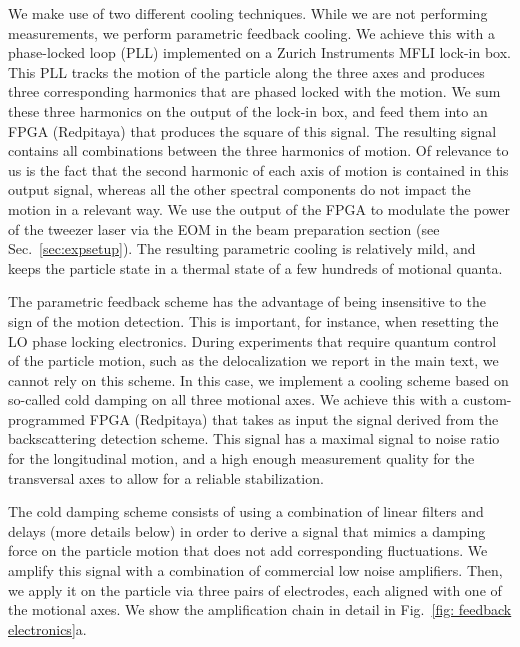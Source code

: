 \documentclass[aps, 
reprint, 
notitlepage,  superscriptaddress, 
onecolumn]{revtex4-1}
\newcommand{\<}{\langle}
\renewcommand{\>}{\rangle}
\begin{document}
We make use of two different cooling techniques. While we are not performing measurements, we perform parametric feedback cooling. 
%
We achieve this with a phase-locked loop (PLL) implemented on a Zurich Instruments MFLI lock-in box. 
%
This PLL tracks the motion of the particle along the three axes and produces three corresponding harmonics that are phased locked with the motion. 
%
We sum these three harmonics on the output of the lock-in box, and feed them into an FPGA (Redpitaya) that produces the square of this signal. 
%
The resulting signal contains all combinations between the three harmonics of motion. 
%
Of relevance to us is the fact that the second harmonic of each axis of motion is contained in this output signal, whereas all the other spectral components do not impact the motion in a relevant way. 
%
We use the output of the FPGA to modulate the power of the tweezer laser via the EOM in the beam preparation section (see Sec.~\ref{sec:expsetup}).
%
The resulting parametric cooling is relatively mild, and keeps the particle state in a thermal state of a few hundreds of motional quanta. 

The parametric feedback scheme has the advantage of being insensitive to the sign of the motion detection. 
%
This is important, for instance, when resetting the LO phase locking electronics.
%
During experiments that require quantum control of the particle motion, such as the delocalization we report in the main text, we cannot rely on this scheme.
%
In this case, we implement a cooling scheme based on so-called cold damping on all three motional axes. 
%
We achieve this with a custom-programmed FPGA (Redpitaya) that takes as input the signal derived from the backscattering detection scheme. This signal has a maximal signal to noise ratio for the longitudinal motion, and a high enough measurement quality for the transversal axes to allow for a reliable stabilization. 

The cold damping scheme consists of using a combination of linear filters and delays (more details below) in order to derive a signal that mimics a damping force on the particle motion that does not add corresponding fluctuations. 
%
We amplify this signal with a combination of commercial low noise amplifiers.
%
Then, we apply it on the particle via three pairs of electrodes, each aligned with one of the motional axes. We show the amplification chain in detail in Fig.~\ref{fig: feedback electronics}a.
\end{document}
